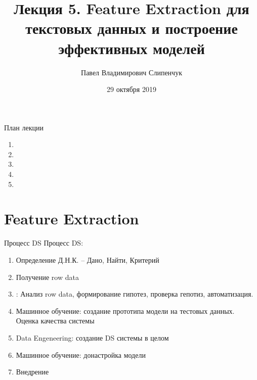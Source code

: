


\title{Лекция 5. Feature Extraction для текстовых данных и построение эффективных моделей}

\date{29 октября 2019}
\author{Павел Владимирович Слипенчук }


  \maketitle
    
\begin{frame}{План лекции}
    \begin{enumerate}
    	\item {}
		\item {}
		\item {}
		\item {}
		\item {}
	\end{enumerate}
\end{frame}

\section{Feature Extraction}\label{section:fe}

\begin{frame}{Процесс DS}
	Процесс DS:
	\begin{enumerate}
		\item Определение Д.Н.К. -- Дано, Найти, Критерий
		\item Получение row data
		\item {}: Анализ row data, формирование гипотез, проверка гепотиз, автоматизация.
		\item Машинное обучение: создание прототипа модели на тестовых данных. Оценка качества системы
		\item Data Engeneering: создание DS системы в целом
		\item Машинное обучение: донастройка модели
		\item Внедрение
	\end{enumerate}
\end{frame}

